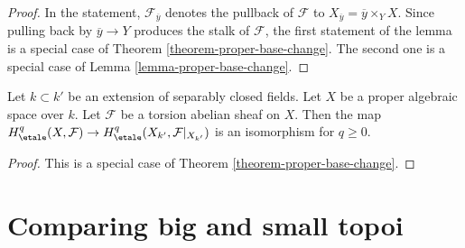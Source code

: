 \begin{proof}
In the statement, $\mathcal{F}_{\overline{y}}$ denotes the pullback
of $\mathcal{F}$ to $X_{\overline{y}} = \overline{y} \times_Y X$.
Since pulling back by $\overline{y} \to Y$ produces the
stalk of $\mathcal{F}$, the first statement of the lemma
is a special case of Theorem \ref{theorem-proper-base-change}.
The second one is a special case of Lemma \ref{lemma-proper-base-change}.
\end{proof}

\begin{lemma}
\label{lemma-base-change-separably-closed}
Let $k \subset k'$ be an extension of separably closed fields.
Let $X$ be a proper algebraic space over $k$.
Let $\mathcal{F}$ be a torsion abelian sheaf on $X$.
Then the map $H^q_\etale(X, \mathcal{F}) \to
H^q_\etale(X_{k'}, \mathcal{F}|_{X_{k'}})$ is an isomorphism
for $q \geq 0$.
\end{lemma}

\begin{proof}
This is a special case of Theorem \ref{theorem-proper-base-change}.
\end{proof}










\section{Comparing big and small topoi}
\label{section-compare}

